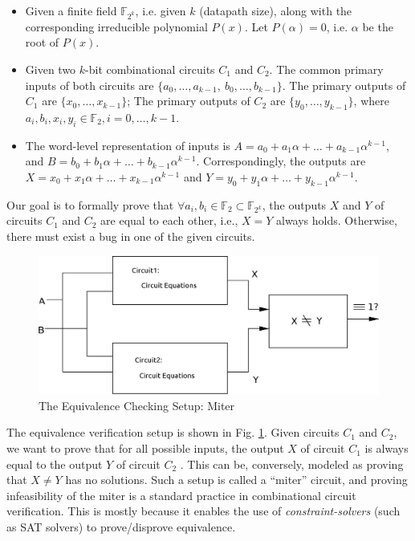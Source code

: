 \begin{itemize}
\item Given a finite field $\mathbb{F}_{2^k}$, i.e. given $k$ (datapath size), along with the
  corresponding irreducible polynomial $P(x)$. Let $P(\alpha) = 0$,
  i.e. $\alpha$ be the root of $P(x)$.   
\item  Given two $k$-bit combinational circuits $C_{1}$ and $C_{2}$. 
		The common primary inputs of both circuits are $\{a_0,
                \dots, a_{k-1}, ~b_0,\dots, b_{k-1}\}$.  
		The primary outputs of $C_{1}$ are $\{x_0, \dots, x_{k-1}\}$;
		The primary outputs of $C_{2}$ are $\{y_0, \dots, y_{k-1}\}$, 
		where $a_i, b_i, x_i, y_i\in \mathbb{F}_2, i = 0, \dots, k-1$.

\item		The word-level representation of inputs is $A = a_0 +
  a_1 \alpha + \dots + a_{k-1}\alpha^{k-1}$, and $B = b_0 + b_1 \alpha
  + \dots + b_{k-1}\alpha^{k-1}$.  Correspondingly, the outputs are
		$X = x_0 + x_1\alpha  + \dots +  x_{k-1}\alpha^{k-1}$
                and $Y = y_0 + y_1\alpha  + \dots +
                y_{k-1}\alpha^{k-1}$. 
\end{itemize}
Our goal is to formally prove that $\forall a_{i},b_{i} \in
\mathbb{F}_{2} \subset \mathbb{F}_{2^k}$, the outputs $X$ and $Y$ of
circuits $C_{1}$ and $C_{2}$ are equal to each other,  i.e., $ X=Y$
always holds. Otherwise, there must exist a bug in one of the given
circuits.   


\begin{figure}[htb]
\centerline{
\includegraphics[scale=0.3]{./figures/miter.eps}
}
\caption{The Equivalence Checking Setup: Miter}
\label{fig:miter}
\end{figure}

The equivalence verification setup is shown in Fig. \ref{fig:miter}. 
Given circuits $C_{1}$ and $C_{2}$, 
we want to prove that for all possible inputs, 
the output $X$ of circuit $C_{1}$ is always equal to the output $Y$ of circuit $C_{2}$ . 
This can be, conversely, modeled as proving that $X \neq Y$ has no
solutions. Such a setup is called a ``miter'' circuit, and proving
infeasibility of the miter is a standard practice in combinational
circuit verification. This is mostly because it enables the use of
{\it constraint-solvers} (such as SAT solvers) to prove/disprove
equivalence.  

